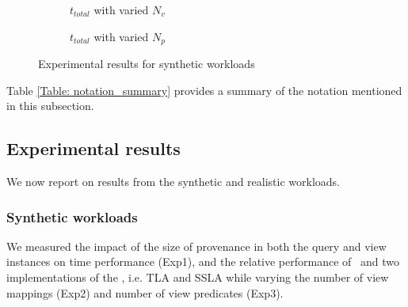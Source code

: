 \begin{figure}
\begin{subfigure}{0.30\textwidth}
        \caption{$t_{total}$ with varied $N_v$}
        \label{fig:stress_test_view_num}
    \end{subfigure}
    \hfill
    \begin{subfigure}{0.30\textwidth}
    \hspace*{-0.8cm}
        \caption{$t_{total}$ with varied $N_p$}
        \label{fig:stress_test_predicate_num_time}
    \end{subfigure}
    \caption{Experimental results for synthetic workloads}
\end{figure}

Table \ref{Table: notation_summary} provides a summary of the notation mentioned in this subsection.%

\subsection{Experimental results}
We now report on results from the synthetic and realistic workloads.

\subsubsection{Synthetic workloads} \label{sec: synthetic_exp}
We measured the impact of the size of provenance in both the query and view instances on time performance (Exp1), and the relative performance of \provalg\ and two implementations of the \rba, i.e. TLA and SSLA while varying the number of view mappings (Exp2) and number of view predicates (Exp3).

